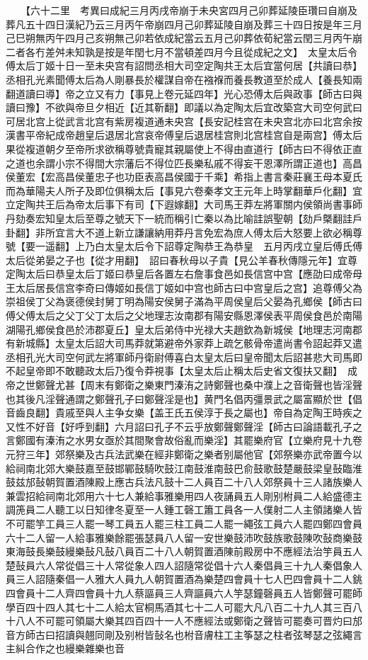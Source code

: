 　　【六十二里　考異曰成紀三月丙戌帝崩于未央宮四月己卯葬延陵臣瓚曰自崩及葬凡五十四日漢紀乃云三月丙午帝崩四月己卯葬延陵自崩及葬三十四日按是年三月己巳朔無丙午四月己亥朔無己卯若依成紀當云五月己卯葬依荀紀當云閏三月丙午崩二者各冇差舛未知孰是按是年閏七月不當頓差四月今且從成紀之文】　太皇太后令傅太后丁姬十日一至未央宫有詔問丞相大司空定陶共王太后宜當何居【共讀曰恭】丞相孔光素聞傅太后為人剛暴長於權謀自帝在襁褓而養長教道至於成人【養長知兩翻道讀曰導】帝之立又有力【事見上卷元延四年】光心恐傅太后與政事【師古曰與讀曰豫】不欲與帝旦夕相近【近其靳翻】即議以為定陶太后宜改築宫大司空何武曰可居北宫上從武言北宫有紫房複道通未央宫【長安記桂宫在未央宫北亦曰北宫余按漢書平帝紀成帝趙皇后退居北宫哀帝傅皇后退居桂宫則北宫桂宫自是兩宫】傅太后果從複道朝夕至帝所求欲稱尊號貴寵其親屬使上不得由直道行【師古曰不得依正直之道也余謂小宗不得間大宗藩后不得位匹長樂私戚不得妄干恩澤所謂正道也】高昌侯董宏【宏高昌侯董忠子也功臣表高昌侯國于千乘】希指上書言秦莊襄王母本夏氏而為華陽夫人所子及即位俱稱太后【事見六卷秦孝文王元年上時掌翻華戶化翻】宜立定陶共王后為帝太后事下有司【下遐嫁翻】大司馬王莽左將軍關内侯領尚書事師丹劾奏宏知皇太后至尊之號天下一統而稱引亡秦以為比喻詿誤聖朝【劾戶槩翻詿戶卦翻】非所宜言大不道上新立謙讓納用莽丹言免宏為庶人傅太后大怒要上欲必稱尊號【要一遥翻】上乃白太皇太后令下詔尊定陶恭王為恭皇　五月丙戌立皇后傅氏傅太后從弟晏之子也【從才用翻】　詔曰春秋母以子貴【見公羊春秋傳隱元年】宜尊定陶太后曰恭皇太后丁姬曰恭皇后各置左右詹事食邑如長信宫中宫【應劭曰成帝母王太后居長信宫李奇曰傳姬如長信丁姬如中宫也師古曰中宫皇后之宫】追尊傅父為崇祖侯丁父為褒德侯封舅丁明為陽安侯舅子滿為平周侯皇后父晏為孔鄉侯【師古曰傅父傅太后之父丁父丁太后之父地理志汝南郡有陽安縣恩澤侯表平周侯食邑於南陽湖陽孔鄉侯食邑於沛郡夏丘】皇太后弟侍中光禄大夫趙欽為新城侯【地理志河南郡有新城縣】太皇太后詔大司馬莽就第避帝外家莽上疏乞骸骨帝遣尚書令詔起莽又遣丞相孔光大司空何武左將軍師丹衛尉傅喜白太皇太后曰皇帝聞太后詔甚悲大司馬即不起皇帝即不敢聽政太后乃復令莽視事【太皇太后止稱太后史省文復扶又翻】　成帝之世鄭聲尤甚【周末有鄭衛之樂東門溱洧之詩鄭聲也桑中濮上之音衛聲也皆淫聲也其後凡淫聲通謂之鄭聲孔子曰鄭聲淫是也】黄門名倡丙彊景武之屬富顯於世【倡音齒良翻】貴戚至與人主争女樂【盖王氏五侯淳于長之屬也】帝自為定陶王時疾之又性不好音【好呼到翻】六月詔曰孔子不云乎放鄭聲鄭聲淫【師古曰論語載孔子之言鄭國有溱洧之水男女亟於其間聚會故俗亂而樂淫】其罷樂府官【立樂府見十九卷元狩三年】郊祭樂及古兵法武樂在經非鄭衛之樂者别屬他官【郊祭樂亦武帝置今以給祠南北郊大樂鼓嘉至鼓邯鄲鼓騎吹鼓江南鼓淮南鼓巴俞鼓歌鼓楚嚴鼓梁皇鼔臨淮鼓兹邡鼔朝賀置酒陳殿上應古兵法凡鼓十二人員百二十八人郊祭員十三人諸族樂人兼雲招給祠南北郊用六十七人兼給事雅樂用四人夜誦員五人剛别柎員二人給盛德主調箎員二人聽工以日知律冬夏至一人鍾工磬工簫工員各一人僕射二人主領諸樂人皆不可罷竽工員三人罷一琴工員五人罷三柱工員二人罷一繩弦工員六人罷四鄭四會員六十二人留一人給事雅樂餘罷張瑟員八人留一安世樂鼓沛吹鼓族歌鼓陳吹鼔商樂鼓東海鼓長樂鼓縵樂鼔凡鼔八員百二十八人朝賀置酒陳前殿房中不應經法治竽員五人楚鼔員六人常從倡三十人常從象人四人詔隨常從倡十六人秦倡員三十九人秦倡象人員三人詔隨秦倡一人雅大人員九人朝賀置酒為樂楚四會員十七人巴四會員十二人銚四會員十二人齊四會員十九人蔡謳員三人齊謳員六人竽瑟鐘磬員五人皆鄭聲可罷師學百四十四人其七十二人給太官桐馬酒其七十二人可罷大凡八百二十九人其三百八十八人不可罷可領屬大樂其四百四十一人不應經法或鄭衛之聲皆可罷奏可晋灼曰邡音方師古曰招讀與翹同剛及别柎皆鼔名也柎音膚柱工主筝瑟之柱者弦琴瑟之弦繩言主糾合作之也縵樂雜樂也音